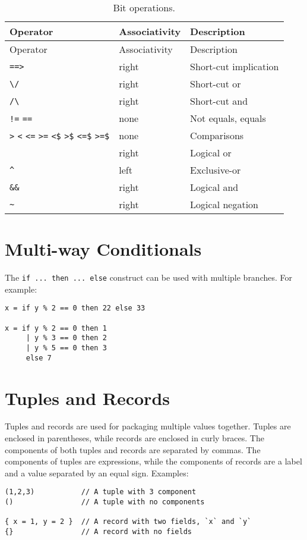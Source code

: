 \begin{longtable}[]{@{}lll@{}}
\caption{Bit operations.}\tabularnewline
\toprule
Operator & Associativity & Description\tabularnewline
\midrule
\endfirsthead
\toprule
Operator & Associativity & Description\tabularnewline
\midrule
\endhead
\texttt{==\textgreater{}} & right & Short-cut implication\tabularnewline
\texttt{\textbackslash{}/} & right & Short-cut or\tabularnewline
\texttt{/\textbackslash{}} & right & Short-cut and\tabularnewline
\texttt{!=} \texttt{==} & none & Not equals, equals\tabularnewline
\texttt{\textgreater{}} \texttt{\textless{}} \texttt{\textless{}=}
\texttt{\textgreater{}=} \texttt{\textless{}\$}
\texttt{\textgreater{}\$} \texttt{\textless{}=\$}
\texttt{\textgreater{}=\$} & none & Comparisons\tabularnewline
\texttt{\textbar{}\textbar{}} & right & Logical or\tabularnewline
\texttt{\^{}} & left & Exclusive-or\tabularnewline
\texttt{\&\&} & right & Logical and\tabularnewline
\texttt{\textasciitilde{}} & right & Logical negation\tabularnewline
\bottomrule
\end{longtable}

\section{Multi-way Conditionals}\label{multi-way-conditionals}

The \texttt{if\ ...\ then\ ...\ else} construct can be used with
multiple branches. For example:

\begin{verbatim}
x = if y % 2 == 0 then 22 else 33

x = if y % 2 == 0 then 1
     | y % 3 == 0 then 2
     | y % 5 == 0 then 3
     else 7
\end{verbatim}

\section{Tuples and Records}\label{tuples-and-records}

Tuples and records are used for packaging multiple values together.
Tuples are enclosed in parentheses, while records are enclosed in curly
braces. The components of both tuples and records are separated by
commas. The components of tuples are expressions, while the components
of records are a label and a value separated by an equal sign. Examples:

\begin{verbatim}
(1,2,3)           // A tuple with 3 component
()                // A tuple with no components

{ x = 1, y = 2 }  // A record with two fields, `x` and `y`
{}                // A record with no fields
\end{verbatim}

